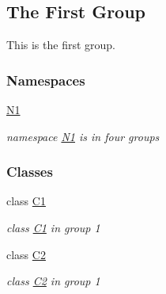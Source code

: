 \hypertarget{group__group1}{}\subsection{The First Group}
\label{group__group1}


This is the first group.  


\subsubsection*{Namespaces}
\begin{DoxyCompactItemize}
\item 
 \hyperlink{namespace_n1}{N1}
\begin{DoxyCompactList}\small\item\em namespace \hyperlink{namespace_n1}{N1} is in four groups \end{DoxyCompactList}\end{DoxyCompactItemize}
\subsubsection*{Classes}
\begin{DoxyCompactItemize}
\item 
class \hyperlink{class_c1}{C1}
\begin{DoxyCompactList}\small\item\em class \hyperlink{class_c1}{C1} in group 1 \end{DoxyCompactList}\item 
class \hyperlink{class_c2}{C2}
\begin{DoxyCompactList}\small\item\em class \hyperlink{class_c2}{C2} in group 1 \end{DoxyCompactList}\end{DoxyCompactItemize}
